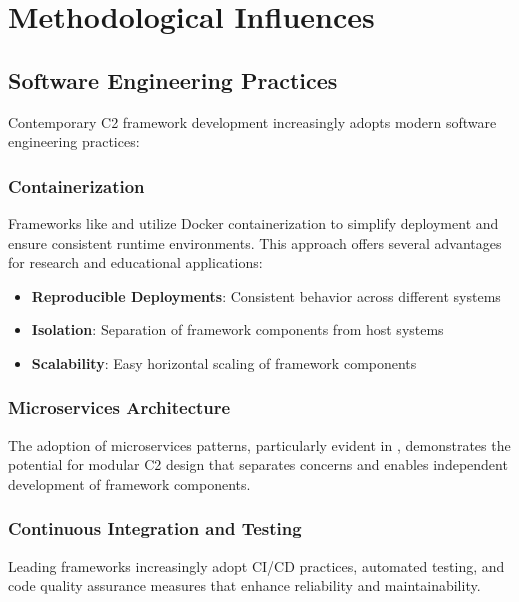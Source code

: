 \section{Methodological Influences}
\label{sec:methodological_influences}

\subsection{Software Engineering Practices}
\label{subsec:software_engineering}

Contemporary C2 framework development increasingly adopts modern software engineering practices:

\subsubsection{Containerization}

Frameworks like  and  utilize Docker containerization to simplify deployment and ensure consistent runtime environments. This approach offers several advantages for research and educational applications:

\begin{itemize}
\item \textbf{Reproducible Deployments}: Consistent behavior across different systems
\item \textbf{Isolation}: Separation of framework components from host systems
\item \textbf{Scalability}: Easy horizontal scaling of framework components
\end{itemize}

\subsubsection{Microservices Architecture}

The adoption of microservices patterns, particularly evident in , demonstrates the potential for modular C2 design that separates concerns and enables independent development of framework components.

\subsubsection{Continuous Integration and Testing}

Leading frameworks increasingly adopt CI/CD practices, automated testing, and code quality assurance measures that enhance reliability and maintainability.

